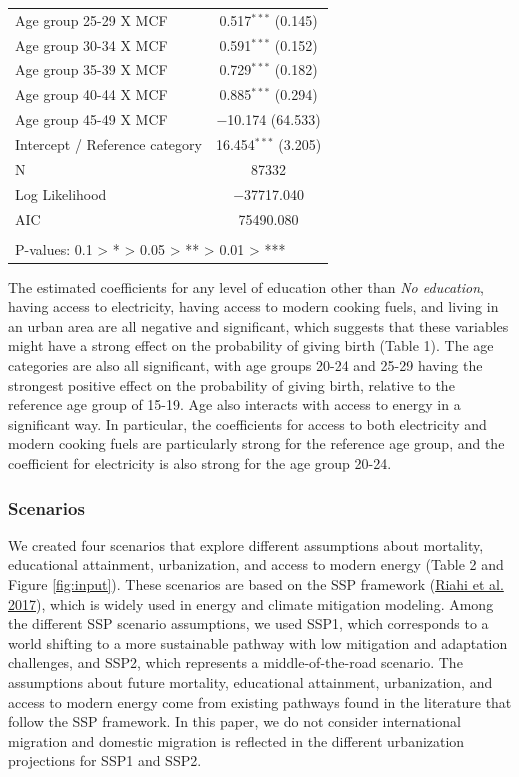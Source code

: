 \documentclass[
]{article}
\begin{document}
\begin{table}[!htbp]
\begin{tabular}{@{\extracolsep{5pt}}lc}
  Age group 25-29 X MCF & 0.517$^{***}$ (0.145) \\ 
  Age group 30-34 X MCF & 0.591$^{***}$ (0.152) \\ 
  Age group 35-39 X MCF & 0.729$^{***}$ (0.182) \\ 
  Age group 40-44 X MCF & 0.885$^{***}$ (0.294) \\ 
  Age group 45-49 X MCF & $-$10.174 (64.533) \\ 
  Intercept / Reference category & 16.454$^{***}$ (3.205) \\ 
 N & 87332 \\ 
Log Likelihood & $-$37717.040 \\ 
AIC & 75490.080 \\ 
\hline \\[-1.8ex] 
\multicolumn{2}{l}{P-values: 0.1 > * > 0.05 > ** > 0.01 > ***} \\ 
\end{tabular} 
\end{table}

The estimated coefficients for any level of education other than \emph{No education}, having access to electricity, having access to modern cooking fuels, and living in an urban area are all negative and significant, which suggests that these variables might have a strong effect on the probability of giving birth (Table 1). The age categories are also all significant, with age groups 20-24 and 25-29 having the strongest positive effect on the probability of giving birth, relative to the reference age group of 15-19. Age also interacts with access to energy in a significant way. In particular, the coefficients for access to both electricity and modern cooking fuels are particularly strong for the reference age group, and the coefficient for electricity is also strong for the age group 20-24.

\newpage

\hypertarget{scenario}{%
\subsubsection{Scenarios}\label{scenario}}

We created four scenarios that explore different assumptions about mortality, educational attainment, urbanization, and access to modern energy (Table 2 and Figure \ref{fig:input}). These scenarios are based on the SSP framework (\protect\hyperlink{ref-riahi_shared_2017}{Riahi et al. 2017}), which is widely used in energy and climate mitigation modeling. Among the different SSP scenario assumptions, we used SSP1, which corresponds to a world shifting to a more sustainable pathway with low mitigation and adaptation challenges, and SSP2, which represents a middle-of-the-road scenario. The assumptions about future mortality, educational attainment, urbanization, and access to modern energy come from existing pathways found in the literature that follow the SSP framework. In this paper, we do not consider international migration and domestic migration is reflected in the different urbanization projections for SSP1 and SSP2.
\end{document}
